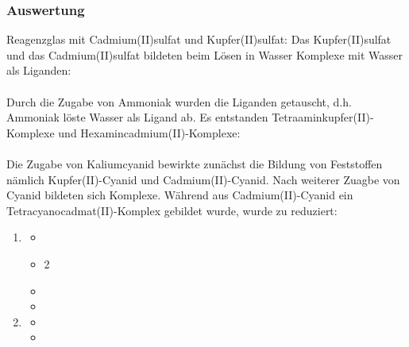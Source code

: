 \documentclass{scrartcl}
\begin{document}
\subsubsection{Auswertung}
Reagenzglas mit Cadmium(II)sulfat und Kupfer(II)sulfat:
Das Kupfer(II)sulfat und das Cadmium(II)sulfat bildeten beim Lösen in Wasser Komplexe mit Wasser als Liganden:\\
\\
Durch die Zugabe von Ammoniak wurden die Liganden getauscht, d.h. Ammoniak löste Wasser als Ligand ab. Es entstanden Tetraaminkupfer(II)-Komplexe und Hexamincadmium(II)-Komplexe:\\
 \\
Die Zugabe von Kaliumcyanid bewirkte zunächst die Bildung von Feststoffen nämlich Kupfer(II)-Cyanid und Cadmium(II)-Cyanid. Nach weiterer Zuagbe von Cyanid bildeten sich Komplexe. Während aus Cadmium(II)-Cyanid ein Tetracyanocadmat(II)-Komplex gebildet wurde, wurde zu  reduziert:
\begin{enumerate}
	\item \begin{itemize}
	\item {}
	\item 2 
	\item {}
	\item {}
\end{itemize}
\item \begin{itemize}

	\item {}
	\item{}
\end{itemize}
\end{enumerate}
\end{document}
